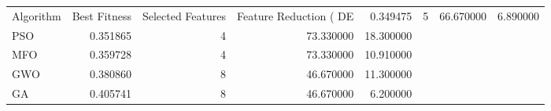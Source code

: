 \begin{tabular}{lrrrr}
\toprule
Algorithm & Best Fitness & Selected Features & Feature Reduction (%
\midrule
DE & 0.349475 & 5 & 66.670000 & 6.890000 \\
PSO & 0.351865 & 4 & 73.330000 & 18.300000 \\
MFO & 0.359728 & 4 & 73.330000 & 10.910000 \\
GWO & 0.380860 & 8 & 46.670000 & 11.300000 \\
GA & 0.405741 & 8 & 46.670000 & 6.200000 \\
\bottomrule
\end{tabular}
